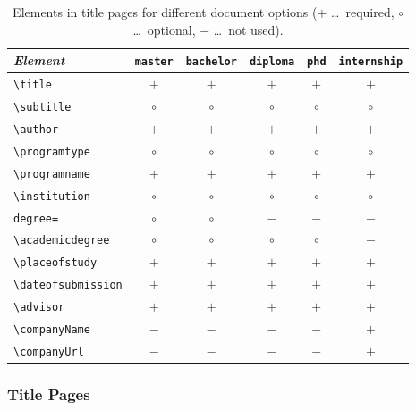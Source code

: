 \begin{table}
    \caption{Elements in title pages for different document options
        ($+$ \ldots\ required, $\circ$ \ldots\ optional, $-$ \ldots\ not used).}
    \label{tab:TitleElements}
    \centering\small
    \begin{tabular}{@{}lccccc@{}}
        \toprule
        \emph{Element} & \texttt{master} & \texttt{bachelor} & 
				\texttt{diploma} & \texttt{phd} & \texttt{internship} \\
        \midrule
        \verb!\title!            & $+$ & $+$ & $+$ & $+$ & $+$ \\
        \verb!\subtitle!         & $\circ$ & $\circ$ & $\circ$ & $\circ$ & $\circ$ \\
        \verb!\author!           & $+$ & $+$ & $+$ & $+$ & $+$ \\
        \verb!\programtype!      & $\circ$ & $\circ$ & $\circ$ & $\circ$ & $\circ$ \\
        \verb!\programname!      & $+$ & $+$ & $+$ & $+$ & $+$ \\
        \verb!\institution!      & $\circ$ & $\circ$ & $\circ$ & $\circ$ & $\circ$ \\
        \texttt{degree=}         & $\circ$ & $\circ$ & $-$ & $-$ & $-$ \\
        \verb!\academicdegree!   & $\circ$ & $\circ$ & $\circ$ & $\circ$ & $-$ \\
        \verb!\placeofstudy!     & $+$ & $+$ & $+$ & $+$ & $+$ \\
        \verb!\dateofsubmission! & $+$ & $+$ & $+$ & $+$ & $+$ \\
        \verb!\advisor!          & $+$ & $+$ & $+$ & $+$ & $+$ \\
        \verb!\companyName!      & $-$ & $-$ & $-$ & $-$ & $+$ \\
        \verb!\companyUrl!       & $-$ & $-$ & $-$ & $-$ & $+$ \\
        \bottomrule
    \end{tabular}
\end{table}

\subsubsection{Title Pages}

